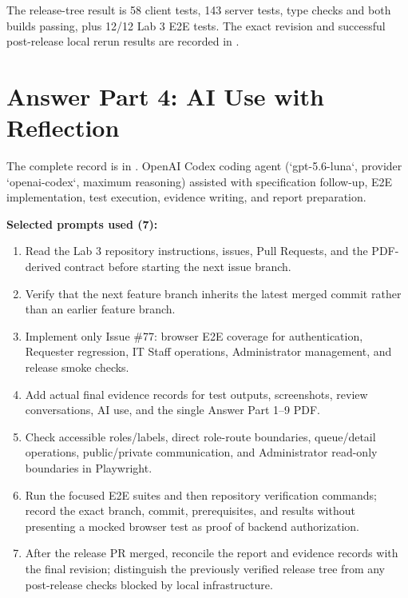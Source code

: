 \documentclass[10pt,a4paper]{article}
\begin{document}
The release-tree result is 58 client tests, 143 server tests, type checks and
both builds passing, plus 12/12 Lab 3 E2E tests. The exact revision and successful
post-release local rerun results are recorded in
\href{https://github.com/ovenmakemeheat/toktickit/blob/main/docs/lab-03/evidence/integration-verification.md}{}.

\section{Answer Part 4: AI Use with Reflection}

The complete record is in
\href{https://github.com/ovenmakemeheat/toktickit/blob/main/docs/lab-03/ai-use.md}{}.
OpenAI Codex coding agent (`gpt-5.6-luna`, provider `openai-codex`, maximum
reasoning) assisted with specification follow-up, E2E implementation, test
execution, evidence writing, and report preparation.

\textbf{Selected prompts used (7):}
\begin{enumerate}
  \item Read the Lab 3 repository instructions, issues, Pull Requests, and the PDF-derived contract before starting the next issue branch.
  \item Verify that the next feature branch inherits the latest merged  commit rather than an earlier feature branch.
  \item Implement only Issue \#77: browser E2E coverage for authentication, Requester regression, IT Staff operations, Administrator management, and release smoke checks.
  \item Add actual final evidence records for test outputs, screenshots, review conversations, AI use, and the single Answer Part 1--9 PDF.
  \item Check accessible roles/labels, direct role-route boundaries, queue/detail operations, public/private communication, and Administrator read-only boundaries in Playwright.
  \item Run the focused E2E suites and then repository verification commands; record the exact branch, commit, prerequisites, and results without presenting a mocked browser test as proof of backend authorization.
  \item After the release PR merged, reconcile the report and evidence records with the final  revision; distinguish the previously verified release tree from any post-release checks blocked by local infrastructure.
\end{enumerate}
\end{document}
